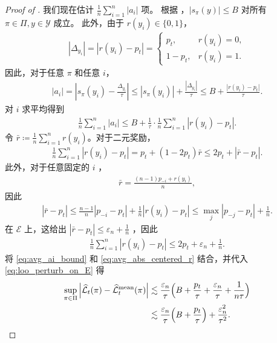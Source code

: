 \documentclass{article}
\theoremstyle{plain}
\theoremstyle{definition}
\theoremstyle{remark}
\newcommand{\abs}[1]{\left|#1\right|}
\begin{document}
\begin{proof}[Proof of ]
    我们现在估计 $\frac{1}{n}\sum_{i=1}^n\abs{a_i}$ 项。  
根据 ，$\abs{s_\pi(y)}\leq B$ 对所有 $\pi\in\Pi, y\in\mathcal{Y}$ 成立。  
此外，由于 $r(y_i)\in\{0,1\}$，
    \begin{align*}
        \abs{\Delta_{y_i}}
        =\abs{r(y_i)-p_t}
        =
        \begin{cases}
        p_t,& r(y_i)=0,\\
        1-p_t,& r(y_i)=1.
        \end{cases}
    \end{align*}
    因此，对于任意 $\pi$ 和任意 $i$，
    \begin{align*}
        \abs{a_i}
        =\abs{s_\pi(y_i)-\frac{\Delta_{y_i}}{\tau}}
        \leq \abs{s_\pi(y_i)}+\frac{\abs{\Delta_{y_i}}}{\tau}
        \leq B+\frac{\abs{r(y_i)-p_t}}{\tau}.
    \end{align*}
    对 $i$ 求平均得到
    \begin{align}\label{eq:avg_ai_bound}
        \frac{1}{n}\sum_{i=1}^n \abs{a_i}
        \leq B+\frac{1}{\tau}\cdot \frac{1}{n}\sum_{i=1}^n \abs{r(y_i)-p_t}.
    \end{align}
    令 $\bar{r}\coloneqq \frac{1}{n}\sum_{i=1}^n r(y_i)$。对于二元奖励，
    \begin{align*}
        \frac{1}{n}\sum_{i=1}^n \abs{r(y_i)-p_t}
        = p_t+(1-2p_t)\bar{r}
        \leq 2p_t+\abs{\bar{r}-p_t}.
    \end{align*}
    此外，对于任意固定的 $i$ ，
    \begin{align*}
        \bar{r}=\frac{(n-1)p_{-i}+r(y_i)}{n},
    \end{align*}
    因此
    \begin{align*}
        \abs{\bar{r}-p_t}
        \leq
        \frac{n-1}{n}\abs{p_{-i}-p_t}+\frac{1}{n}\abs{r(y_i)-p_t}
        \leq
        \max_{j} \abs{p_{-j}-p_t}+\frac{1}{n}.
    \end{align*}
    在 $\mathcal{E}$ 上，这给出 $\abs{\bar{r}-p_t}\leq \varepsilon_n+\frac{1}{n}$ ，因此
    \begin{align}\label{eq:avg_abs_centered_r}
        \frac{1}{n}\sum_{i=1}^n \abs{r(y_i)-p_t}
        \leq
        2p_t+\varepsilon_n+\frac{1}{n}.
    \end{align}
    将 \eqref{eq:avg_ai_bound} 和 \eqref{eq:avg_abs_centered_r} 结合，并代入 \eqref{eq:loo_perturb_on_E} 得
    \begin{align}
        \label{eq:loo_perturb_final}
        \sup_{\pi\in\Pi}
        \abs{\widehat{\mathcal{L}}_t(\pi)-\widehat{\mathcal{L}}^{\mathrm{mean}}_t(\pi)}
        &\lesssim\frac{\varepsilon_n}{\tau}\Bigl(B+\frac{p_t}{\tau} + \frac{\varepsilon_n}{\tau} + \frac{1}{n\tau}\Bigr)\nonumber\\
        &\lesssim\frac{\varepsilon_n}{\tau}\Bigl(B+\frac{p_t}{\tau}\Bigr)
        +\frac{\varepsilon_n^2}{\tau^2}.
    \end{align}


\end{proof}
\end{document}
